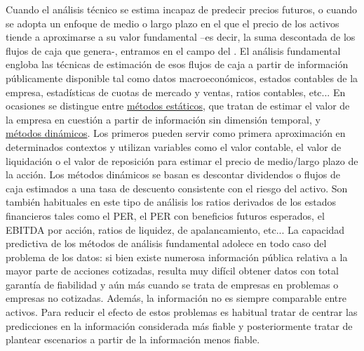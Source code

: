 \documentclass{nuevotema}
\begin{document}
Cuando el análisis técnico se estima incapaz de predecir precios futuros, o cuando se adopta un enfoque de medio o largo plazo en el que el precio de los activos tiende a aproximarse a su valor fundamental --es decir, la suma descontada de los flujos de caja que genera-, entramos en el campo del . El análisis fundamental engloba las técnicas de estimación de esos flujos de caja a partir de información públicamente disponible tal como datos macroeconómicos, estados contables de la empresa, estadísticas de cuotas de mercado y ventas, ratios contables, etc... En ocasiones se distingue entre \underline{métodos estáticos}, que tratan de estimar el valor de la empresa en cuestión a partir de información sin dimensión temporal, y \underline{métodos dinámicos}. Los primeros pueden servir como primera aproximación en determinados contextos y utilizan variables como el valor contable, el valor de liquidación o el valor de reposición para estimar el precio de medio/largo plazo de la acción. Los métodos dinámicos se basan es descontar dividendos o flujos de caja estimados a una tasa de descuento consistente con el riesgo del activo. Son también habituales en este tipo de análisis los ratios derivados de los estados financieros tales como el PER, el PER con beneficios futuros esperados, el EBITDA por acción, ratios de liquidez, de apalancamiento, etc... La capacidad predictiva de los métodos de análisis fundamental adolece en todo caso del problema de los datos: si bien existe numerosa información pública relativa a la mayor parte de acciones cotizadas, resulta muy difícil obtener datos con total garantía de fiabilidad y aún más cuando se trata de empresas en problemas o empresas no cotizadas. Además, la información no es siempre comparable entre activos.  Para reducir el efecto de estos problemas es habitual tratar de centrar las predicciones en la información considerada más fiable y posteriormente tratar de plantear escenarios a partir de la información menos fiable.
\end{document}
